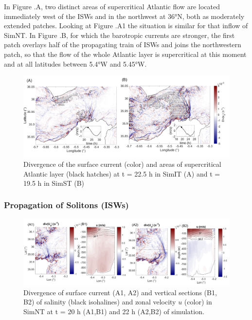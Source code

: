 In Figure .A, two distinct areas of supercritical Atlantic flow are located immediately west of the ISWs and in the northwest at 36°N, both as moderately extended patches. Looking at Figure .A1 the situation is similar for that inflow of SimNT. In Figure .B, for which the barotropic currents are stronger, the first patch overlays half of the propagating train of ISWs and joins the northwestern patch, so that the flow of the whole Atlantic layer is supercritical at this moment and at all latitudes between 5.4°W and 5.45°W.

\begin{figure}[!h]
 \centering
\includegraphics[width=\linewidth]{./GBR3D/FigWaveCont.png}
 \caption [Divergence of the surface current and areas of supercritical Atlantic layer]{Divergence of the surface current (color) and areas of supercritical Atlantic layer (black hatches) at t = 22.5 h in SimIT (A) and t = 19.5 h in SimST (B)}
 \label{FigISWGBR3D}
\end{figure}

\subsubsection{Propagation of Solitons (ISWs)}
\label{section_sim3D_ISW}

\begin{figure}[!h]
 \centering
 \includegraphics[width=1.\textwidth]{./GBR3D/coupesISW_ME2-2.png}
 \caption [Divergence of surface current and vertical sections of salinity and zonal velocity.]{Divergence of surface current (A1, A2) and vertical sections (B1, B2) of salinity (black isohalines) and zonal velocity $u$ (color) in SimNT at t = 20 h (A1,B1) and 22 h (A2,B2) of simulation.}
  \label{FigISWNT}
\end{figure}

